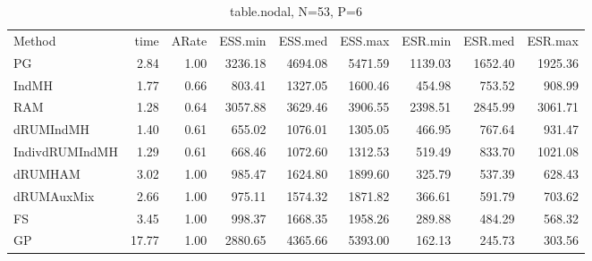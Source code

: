 

\begin{table}
\begin{tabular}{l r r r r r r r r } 
          Method  &     time &    ARate &  ESS.min &  ESS.med &  ESS.max &  ESR.min &  ESR.med &  ESR.max \\ 
              PG  &     2.84 &     1.00 &  3236.18 &  4694.08 &  5471.59 &  1139.03 &  1652.40 &  1925.36 \\ 
           IndMH  &     1.77 &     0.66 &   803.41 &  1327.05 &  1600.46 &   454.98 &   753.52 &   908.99 \\ 
             RAM  &     1.28 &     0.64 &  3057.88 &  3629.46 &  3906.55 &  2398.51 &  2845.99 &  3061.71 \\ 
       dRUMIndMH  &     1.40 &     0.61 &   655.02 &  1076.01 &  1305.05 &   466.95 &   767.64 &   931.47 \\ 
  IndivdRUMIndMH  &     1.29 &     0.61 &   668.46 &  1072.60 &  1312.53 &   519.49 &   833.70 &  1021.08 \\ 
         dRUMHAM  &     3.02 &     1.00 &   985.47 &  1624.80 &  1899.60 &   325.79 &   537.39 &   628.43 \\ 
      dRUMAuxMix  &     2.66 &     1.00 &   975.11 &  1574.32 &  1871.82 &   366.61 &   591.79 &   703.62 \\ 
              FS  &     3.45 &     1.00 &   998.37 &  1668.35 &  1958.26 &   289.88 &   484.29 &   568.32 \\ 
              GP  &    17.77 &     1.00 &  2880.65 &  4365.66 &  5393.00 &   162.13 &   245.73 &   303.56
 \end{tabular}
\caption{table.nodal, N=53, P=6}
\end{table}

